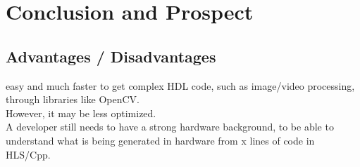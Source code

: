 \chapter{Conclusion and Prospect}
\label{cha:ConclusionAndProspect}


%
%
%
%
%
%

\section{Advantages / Disadvantages}

easy and much faster to get complex HDL code, such as image/video processing, through libraries like OpenCV.\\
However, it may be less optimized.\\
A developer still needs to have a strong hardware background, to be able to understand what is being generated in hardware from x lines of code in HLS/Cpp.
